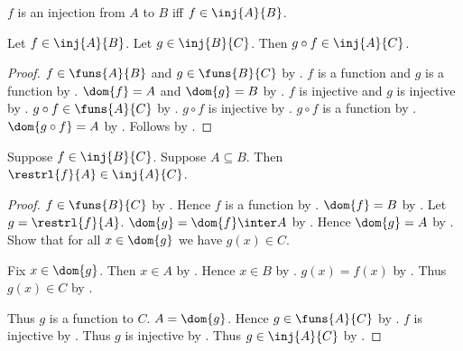\begin{abbreviation}\label{injection_from_to}
    $f$ is an injection from $A$ to $B$ iff $f\in\inj{A}{B}$.
\end{abbreviation}

\begin{proposition}\label{inj_circ}
    Let $f\in\inj{A}{B}$.
    Let $g\in\inj{B}{C}$.
    Then $g\circ f\in\inj{A}{C}$.
\end{proposition}
\begin{proof}
    $f\in\funs{A}{B}$ and $g\in\funs{B}{C}$ by .
    $f$ is a function and $g$ is a function by .
    $\dom{f}=A$ and $\dom{g}=B$ by .
    $f$ is injective and $g$ is injective
        by .
    $g\circ f\in\funs{A}{C}$ by .
    $g\circ f$ is injective by .
    $g\circ f$ is a function by .
    $\dom{g\circ f}=A$ by .
    Follows by .
\end{proof}

\begin{proposition}\label{inj_restrl}
    Suppose $f\in\inj{B}{C}$.
    Suppose $A\subseteq B$.
    Then $\restrl{f}{A}\in\inj{A}{C}$.
\end{proposition}
\begin{proof}
    $f\in\funs{B}{C}$ by .
    Hence $f$ is a function by .
    $\dom{f}=B$ by .
    Let $g=\restrl{f}{A}$.
    $\dom{g}=\dom{f}\inter A$ by .
    Hence $\dom{g}=A$ by .
    Show that for all $x\in\dom{g}$ we have $g(x)\in C$.
    \begin{subproof}
        Fix $x\in\dom{g}$.
        Then $x\in A$ by .
        Hence $x\in B$ by .
        $g(x)=f(x)$ by .
        Thus $g(x)\in C$ by .
    \end{subproof}
    Thus $g$ is a function to $C$.
    $A=\dom{g}$.
    Hence $g\in\funs{A}{C}$ by .
    $f$ is injective by .
    Thus $g$ is injective by .
    Thus $g\in\inj{A}{C}$ by .
\end{proof}

